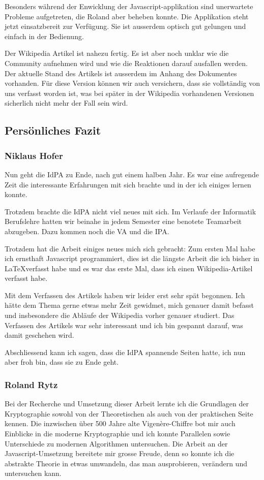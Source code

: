 \documentclass[11pt,paper=a4,final]{scrartcl}
\begin{document}
Besonders w\"ahrend der Enwicklung der
Javascript-applikation sind unerwartete Probleme aufgetreten, die Roland aber
beheben konnte. Die Applikation steht jetzt einsatzbereit zur Verf\"ugung. Sie
ist ausserdem optisch gut gelungen und einfach in der Bedienung.

Der Wikipedia Artikel ist nahezu fertig. Es ist aber noch unklar wie die
Community aufnehmen wird und wie die Reaktionen darauf ausfallen werden. Der
aktuelle Stand des Artikels ist ausserdem im Anhang des Dokumentes vorhanden.
F\"ur diese Version k\"onnen wir auch versichern, dass sie vollst\"andig von uns
verfasst worden ist, was bei sp\"ater in der Wikipedia vorhandenen Versionen
sicherlich nicht mehr der Fall sein wird.
\subsection{Pers\"onliches Fazit}
\subsubsection{Niklaus Hofer}
Nun geht die IdPA zu Ende, nach gut einem halben Jahr. Es war eine aufregende
Zeit die interessante Erfahrungen mit sich brachte und in der ich einiges lernen
konnte.

Trotzdem brachte die IdPA nicht viel neues mit sich. Im Verlaufe der Informatik
Berufslehre hatten wir beinahe in jedem Semester eine benotete Teamarbeit
abzugeben. Dazu kommen noch die VA und die IPA.

Trotzdem hat die Arbeit einiges neues mich sich gebracht: Zum ersten Mal habe
ich ernsthaft Javascript programmiert, dies ist die l\"angste Arbeit die ich
bisher in \LaTeX verfasst habe und es war das erste Mal, dass ich einen
Wikipedia-Artikel verfasst habe.

Mit dem Verfassen des Artikels haben wir leider erst sehr sp\"at begonnen. Ich
h\"atte dem Thema gerne etwas mehr Zeit gewidmet, mich genauer damit befasst und
insbesondere die Abl\"aufe der Wikipedia vorher genauer studiert. Das Verfassen
des Artikels war sehr interessant und ich bin gespannt darauf, was damit
geschehen wird.

Abschliessend kann ich sagen, dass die IdPA spannende Seiten hatte, ich nun aber
froh bin, dass sie zu Ende geht.
\subsubsection{Roland Rytz}
Bei der Recherche und Umsetzung dieser Arbeit lernte ich die Grundlagen der
Kryptographie sowohl von der Theoretischen als auch von der praktischen Seite
kennen. Die inzwischen über 500 Jahre alte Vigenère-Chiffre bot mir auch
Einblicke in die moderne Kryptographie und ich konnte Parallelen sowie
Unterschiede zu modernen Algorithmen untersuchen. Die Arbeit an der
Javascript-Umsetzung bereitete mir grosse Freude, denn so konnte ich die
abstrakte Theorie in etwas umwandeln, das man ausprobieren, verändern und
untersuchen kann.
\end{document}
